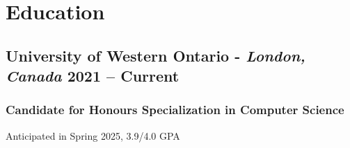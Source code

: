 \documentclass[9pt]{article}
\begin{document}
\section{Education}
\subsection{University of Western Ontario - \normalsize\textit{London, Canada} \hfill \normalsize\textnormal{2021 -- Current}}
\subsubsection{Candidate for Honours Specialization in Computer Science} Anticipated in Spring 2025, 3.9/4.0 GPA 

\end{document}
